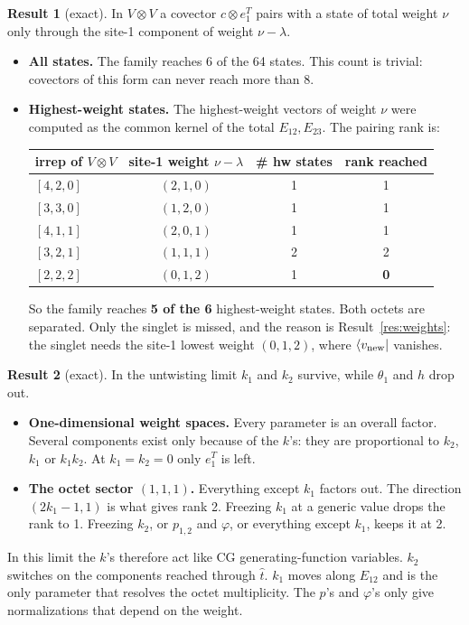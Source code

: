 \documentclass[11pt]{article}
\theoremstyle{definition}
\newtheorem{result}{Result}
\theoremstyle{remark}
\begin{document}
\begin{result}[exact]\label{res:hw}
In $V\otimes V$ a covector $c\otimes e_1^T$ pairs with a state of total weight $\nu$ only through the site-1 component of weight $\nu-\lambda$.
\begin{itemize}
\item \textbf{All states.} The family reaches 6 of the 64 states. This count is trivial: covectors of this form can never reach more than 8.
\item \textbf{Highest-weight states.} The highest-weight vectors of weight $\nu$ were computed as the common kernel of the total $E_{12},E_{23}$. The pairing rank is:
\begin{center}
\begin{tabular}{lccc}\toprule
irrep of $V\otimes V$ & site-1 weight $\nu-\lambda$ & \# hw states & rank reached\\\midrule
$[4,2,0]$ & $(2,1,0)$ & 1 & 1\\
$[3,3,0]$ & $(1,2,0)$ & 1 & 1\\
$[4,1,1]$ & $(2,0,1)$ & 1 & 1\\
$[3,2,1]$ & $(1,1,1)$ & 2 & 2\\
$[2,2,2]$ & $(0,1,2)$ & 1 & \textbf{0}\\\bottomrule
\end{tabular}
\end{center}
So the family reaches \textbf{5 of the 6} highest-weight states. Both octets are separated. Only the singlet is missed, and the reason is Result~\ref{res:weights}: the singlet needs the site-1 lowest weight $(0,1,2)$, where $\langle v_{\rm new}|$ vanishes.
\end{itemize}
\end{result}

\begin{result}[exact]\label{res:params}
In the untwisting limit $k_1$ and $k_2$ survive, while $\theta_1$ and $h$ drop out.
\begin{itemize}
\item \textbf{One-dimensional weight spaces.} Every parameter is an overall factor. Several components exist only because of the $k$'s: they are proportional to $k_2$, $k_1$ or $k_1k_2$. At $k_1=k_2=0$ only $e_1^T$ is left.
\item \textbf{The octet sector $(1,1,1)$.} Everything except $k_1$ factors out. The direction $(2k_1-1,1)$ is what gives rank 2. Freezing $k_1$ at a generic value drops the rank to 1. Freezing $k_2$, or $p_{1,2}$ and $\varphi$, or everything except $k_1$, keeps it at 2.
\end{itemize}
In this limit the $k$'s therefore act like CG generating-function variables. $k_2$ switches on the components reached through $\hat t$. $k_1$ moves along $E_{12}$ and is the only parameter that resolves the octet multiplicity. The $p$'s and $\varphi$'s only give normalizations that depend on the weight.
\end{result}
\end{document}
